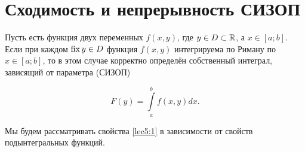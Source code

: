 \documentclass[../../main.tex]{subfiles}
\begin{document}
    \section{Сходимость и непрерывность СИЗОП}
    
    Пусть есть функция двух переменных $f(x,y)$, где $y \in D \subset \mathbb{R}$, 
    а $x \in [a;b]$. Если при каждом $\operatorname{fix} y \in D$ функция
    $f(x, y)$ интегрируема 
    по Риману по $x \in [a;b]$, то в этом случае корректно определён 
    собственный интеграл, зависящий от параметра (СИЗОП)
    
    \begin{equation} \label{lec5:1}
        F(y) = \int\limits_a^b f(x, y)dx.
    \end{equation}

    Мы будем рассматривать свойства \eqref{lec5:1} в зависимости от свойств 
    подынтегральных функций.
\end{document}
